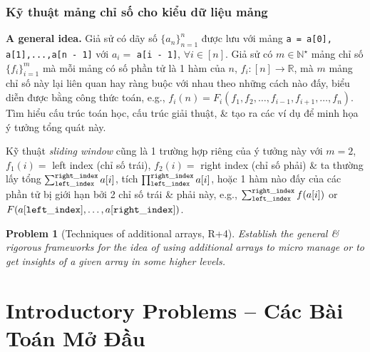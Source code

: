 \documentclass{article}
\newtheorem{problem}{Problem}
\begin{document}
\subsubsection{Kỹ thuật mảng chỉ số cho kiểu dữ liệu mảng}
{\bf A general idea.} Giả sử có dãy số $\{a_n\}_{n=1}^n$ được lưu với mảng {\tt a = a[0], a[1],...,a[n - 1]} với $a_i =$ {\tt a[i - 1]}, $\forall i\in[n]$. Giả sử có $m\in\mathbb{N}^\star$ mảng chỉ số $\{f_i\}_{i=1}^m$ mà mỗi mảng có số phần tử là 1 hàm của $n$, $f_i:[n]\to\mathbb{R}$, mà $m$ mảng chỉ số này lại liên quan hay ràng buộc với nhau theo những cách nào đấy, biểu diễn được bằng công thức toán, e.g., $f_i(n) = F_i(f_1,f_2,\ldots,f_{i-1},f_{i+1},\ldots,f_n)$. Tìm hiểu cấu trúc toán học, cấu trúc giải thuật, \& tạo ra các ví dụ để minh họa ý tưởng tổng quát này.

Kỹ thuật {\it sliding window} cũng là 1 trường hợp riêng của ý tưởng này với $m = 2$, $f_1(i) =$ left index (chỉ số trái), $f_2(i) =$ right index (chỉ số phải) \& ta thường lấy tổng $\sum_{\tt left\_index}^{\tt right\_index} a[i]$, tích $\prod_{\tt left\_index}^{\tt right\_index} a[i]$, hoặc 1 hàm nào đấy của các phần tử bị giới hạn bởi 2 chỉ số trái \& phải này, e.g., $\sum_{\tt left\_index}^{\tt right\_index} f(a[i])$ or $F(a[{\tt left\_index}],\ldots,a[{\tt right\_index}])$.

\begin{problem}[Techniques of additional arrays, R+4]
	Establish the general \& rigorous frameworks for the idea of using additional arrays to micro manage or to get insights of a given array in some higher levels.
\end{problem}


\section{Introductory Problems -- Các Bài Toán Mở Đầu}
\end{document}
